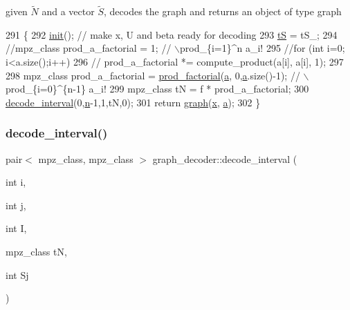 given $\tilde{N}$ and a vector $\tilde{S}$, decodes the graph and returns an object of type graph 


\begin{DoxyCode}
291 \{
292   \hyperlink{classgraph__decoder_a97a9dcd5af21ece86fa91adcb41ca9cc}{init}(); \textcolor{comment}{// make x, U and beta ready for decoding }
293   \hyperlink{classgraph__decoder_ac466636b9b21122f4fa0246aa624978c}{tS} = tS\_;
294   \textcolor{comment}{//mpz\_class prod\_a\_factorial = 1; // \(\backslash\)prod\_\{i=1\}^n a\_i!}
295   \textcolor{comment}{//for (int i=0; i<a.size();i++)}
296   \textcolor{comment}{//  prod\_a\_factorial *= compute\_product(a[i], a[i], 1);}
297 
298   mpz\_class prod\_a\_factorial = \hyperlink{compression__helper_8cpp_a86d8a20e022dc06b23df3b08ac10b7d1}{prod\_factorial}(\hyperlink{classgraph__decoder_a9dd7c3c11b8a45a12cb7c3c2d2bfa2cc}{a}, 0,\hyperlink{classgraph__decoder_a9dd7c3c11b8a45a12cb7c3c2d2bfa2cc}{a}.size()-1); \textcolor{comment}{// \(\backslash\)prod\_\{i=0\}^\{n-1\} a\_i!}
299   mpz\_class tN = f * prod\_a\_factorial;
300   \hyperlink{classgraph__decoder_a2cb0bd279889a833d4c825e99eb72410}{decode\_interval}(0,\hyperlink{classgraph__decoder_a6bc1e72b2f7a913d14b789a6c2d92c1e}{n}-1,1,tN,0);
301   \textcolor{keywordflow}{return} \hyperlink{classgraph}{graph}(\hyperlink{classgraph__decoder_aa3f2776afe387668cf7f68109428e14e}{x}, \hyperlink{classgraph__decoder_a9dd7c3c11b8a45a12cb7c3c2d2bfa2cc}{a});
302 \}
\end{DoxyCode}
\mbox{\label{classgraph__decoder_a2cb0bd279889a833d4c825e99eb72410}} 
\subsubsection{\texorpdfstring{decode\+\_\+interval()}{decode\_interval()}}
{\footnotesize\ttfamily pair$<$ mpz\+\_\+class, mpz\+\_\+class $>$ graph\+\_\+decoder\+::decode\+\_\+interval (\begin{DoxyParamCaption}\item[{int}]{i,  }\item[{int}]{j,  }\item[{int}]{I,  }\item[{mpz\+\_\+class}]{tN,  }\item[{int}]{Sj }\end{DoxyParamCaption})}



